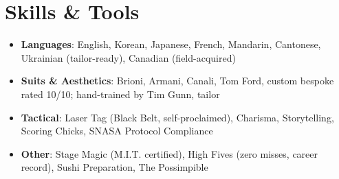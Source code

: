 \documentclass[letterpaper,10.5pt]{article}
\begin{document}
\section*{Skills \& Tools}
\begin{itemize}
  \item \textbf{Languages}: English, Korean, Japanese, French, Mandarin, Cantonese, Ukrainian (tailor-ready), Canadian (field-acquired)
  \item \textbf{Suits \& Aesthetics}: Brioni, Armani, Canali, Tom Ford, custom bespoke rated 10/10; hand-trained by Tim Gunn, tailor
  \item \textbf{Tactical}: Laser Tag (Black Belt, self-proclaimed), Charisma, Storytelling, Scoring Chicks, SNASA Protocol Compliance
  \item \textbf{Other}: Stage Magic (M.I.T. certified), High Fives (zero misses, career record), Sushi Preparation, The Possimpible
\end{itemize}
\end{document}
